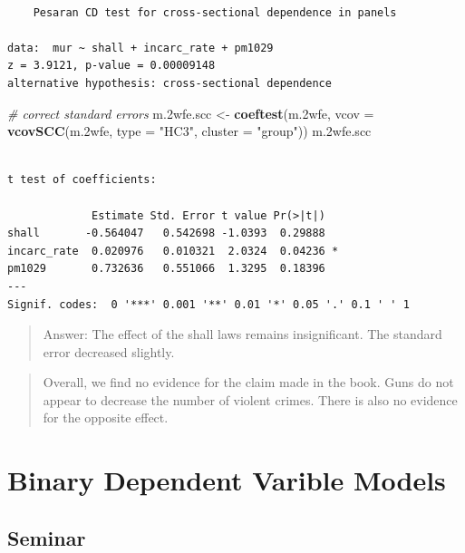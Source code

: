\documentclass[]{article}
\newenvironment{Shaded}{\begin{snugshade}}{\end{snugshade}}
\newcommand{\KeywordTok}[1]{\textcolor[rgb]{0.13,0.29,0.53}{\textbf{#1}}}
\newcommand{\DataTypeTok}[1]{\textcolor[rgb]{0.13,0.29,0.53}{#1}}
\newcommand{\StringTok}[1]{\textcolor[rgb]{0.31,0.60,0.02}{#1}}
\newcommand{\CommentTok}[1]{\textcolor[rgb]{0.56,0.35,0.01}{\textit{#1}}}
\newcommand{\NormalTok}[1]{#1}
\theoremstyle{definition}
\theoremstyle{definition}
\theoremstyle{definition}
\theoremstyle{remark}
\begin{document}
\begin{verbatim}

    Pesaran CD test for cross-sectional dependence in panels

data:  mur ~ shall + incarc_rate + pm1029
z = 3.9121, p-value = 0.00009148
alternative hypothesis: cross-sectional dependence
\end{verbatim}

\begin{Shaded}
\begin{Highlighting}[]
\CommentTok{# correct standard errors}
\NormalTok{m.2wfe.scc <-}\StringTok{ }\KeywordTok{coeftest}\NormalTok{(m.2wfe, }\DataTypeTok{vcov =} \KeywordTok{vcovSCC}\NormalTok{(m.2wfe, }\DataTypeTok{type =} \StringTok{"HC3"}\NormalTok{, }\DataTypeTok{cluster =} \StringTok{"group"}\NormalTok{))}
\NormalTok{m.2wfe.scc}
\end{Highlighting}
\end{Shaded}

\begin{verbatim}

t test of coefficients:

             Estimate Std. Error t value Pr(>|t|)  
shall       -0.564047   0.542698 -1.0393  0.29888  
incarc_rate  0.020976   0.010321  2.0324  0.04236 *
pm1029       0.732636   0.551066  1.3295  0.18396  
---
Signif. codes:  0 '***' 0.001 '**' 0.01 '*' 0.05 '.' 0.1 ' ' 1
\end{verbatim}

\begin{quote}
Answer: The effect of the shall laws remains insignificant. The standard
error decreased slightly.
\end{quote}

\begin{quote}
Overall, we find no evidence for the claim made in the book. Guns do not
appear to decrease the number of violent crimes. There is also no
evidence for the opposite effect.
\end{quote}

\section{Binary Dependent Varible
Models}\label{binary-dependent-varible-models}

\subsection{Seminar}\label{seminar-10}
\end{document}
